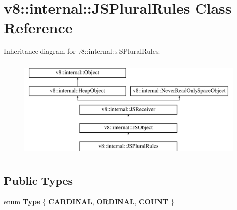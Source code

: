 \hypertarget{classv8_1_1internal_1_1JSPluralRules}{}\section{v8\+:\+:internal\+:\+:J\+S\+Plural\+Rules Class Reference}
\label{classv8_1_1internal_1_1JSPluralRules}
Inheritance diagram for v8\+:\+:internal\+:\+:J\+S\+Plural\+Rules\+:\begin{figure}[H]
\begin{center}
\leavevmode
\includegraphics[height=5.000000cm]{classv8_1_1internal_1_1JSPluralRules}
\end{center}
\end{figure}
\subsection*{Public Types}
\begin{DoxyCompactItemize}
\item 
\mbox{\label{classv8_1_1internal_1_1JSPluralRules_a98be126a1733a163bb5786882910a0fa}} 
enum {\bfseries Type} \{ {\bfseries C\+A\+R\+D\+I\+N\+AL}, 
{\bfseries O\+R\+D\+I\+N\+AL}, 
{\bfseries C\+O\+U\+NT}
 \}
\end{DoxyCompactItemize}
